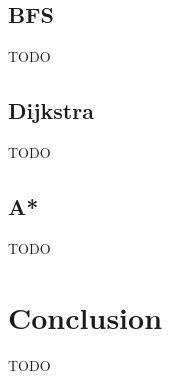 \documentclass{article}
\begin{document}
\subsection{BFS}
TODO
\subsection{Dijkstra}
TODO
\subsection{A*}
TODO

\section{Conclusion}
TODO


\
%
%
%
%



\nocite{*}
\end{document}
